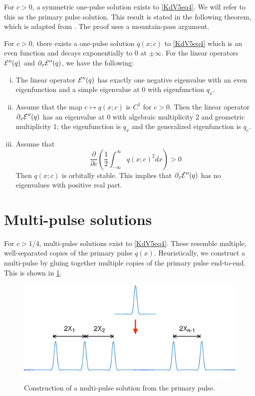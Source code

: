 \documentclass[thesis.tex]{subfiles}
\begin{document}
For $c > 0$, a symmetric one-pulse solution exists to \cref{KdV5eq4}. We will refer to this as the primary pulse solution. This result is stated in the following theorem, which is adapted from \cite[Theorem 2.1]{Pelinovsky2007}. The proof uses a mountain-pass argument.

\begin{theorem}\label{KdV1pulse}
For $c > 0$, there exists a one-pulse solution $q(x; c)$ to \cref{KdV5eq4} which is an even function and decays exponentially to 0 at $\pm \infty$. For the linear operators $\mathcal{E}''(q)$ and $\partial_x \mathcal{E}''(q)$, we have the following:
\begin{enumerate}[(i)]
\item The linear operator $\mathcal{E}''(q)$ has exactly one negative eigenvalue with an even eigenfunction and a simple eigenvalue at 0 with eigenfunction $q_x$.
\item Assume that the map $c \mapsto q(x; c)$ is $C^1$ for $c > 0$. Then the linear operator $\partial_x \mathcal{E}''(q)$ has an eigenvalue at 0 with algebraic multiplicity 2 and geometric multiplicity 1; the eigenfunction is $q_x$ and the generalized eigenfunction is $q_c$. 
\item Assume that 
\[
\frac{\partial}{\partial c} \left( \frac{1}{2} \int_{-\infty}^\infty q(x; c)^2 dx \right) > 0
\]
Then $q(x; c)$ is orbitally stable. This implies that $\partial_x \mathcal{E}''(q)$ has no eigenvalues with positive real part.
\end{enumerate}
\end{theorem}

\section{Multi-pulse solutions}

For $c > 1/4$, multi-pulse solutions exist to \cref{KdV5eq4}. These resemble multiple, well-separated copies of the primary pulse $q(x)$. Heuristically, we construct a multi-pulse by gluing together multiple copies of the primary pulse end-to-end. This is shown in \cref{fig:multipulsediag}.

\begin{figure}[H]
\includegraphics[width=12cm]{images/kdv5numerics/multipulse.eps}
\caption{Construction of a multi-pulse solution from the primary pulse.}
\label{fig:multipulsediag}
\end{figure}
\end{document}
